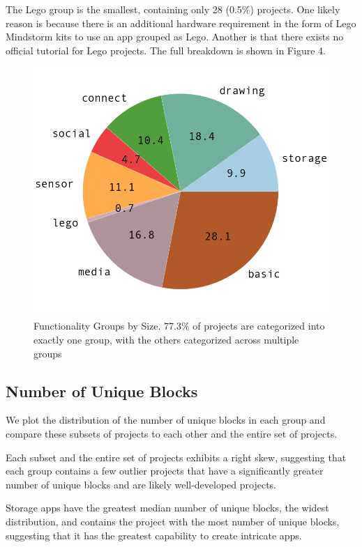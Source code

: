 \documentclass[conference]{IEEEtran}
\begin{document}
The Lego group is the smallest, containing only 28 (0.5\%) projects. One likely reason is because there is an additional hardware requirement in the form of Lego Mindstorm kits to use an app grouped as Lego. Another is that there exists no official tutorial for Lego projects. The full breakdown is shown in Figure 4.

\begin{figure}[h!]
	\centering
	\includegraphics[width=0.9\linewidth]{pie_group.png}
	\caption{Functionality Groups by Size. 77.3\% of projects are categorized into exactly one group, with the others categorized across multiple groups}
	\label{Distribution of Groups}
\end{figure}

\subsection{Number of Unique Blocks}
We plot the distribution of the number of unique blocks in each group and compare these subsets of projects to each other and the entire set of projects.

Each subset and the entire set of projects exhibits a right skew, suggesting that each group contains a few outlier projects that have a significantly greater number of unique blocks and are likely well-developed projects.

Storage apps have the greatest median number of unique blocks, the widest distribution, and contains the project with the most number of unique blocks, suggesting that it has the greatest capability to create intricate apps.
\end{document}
